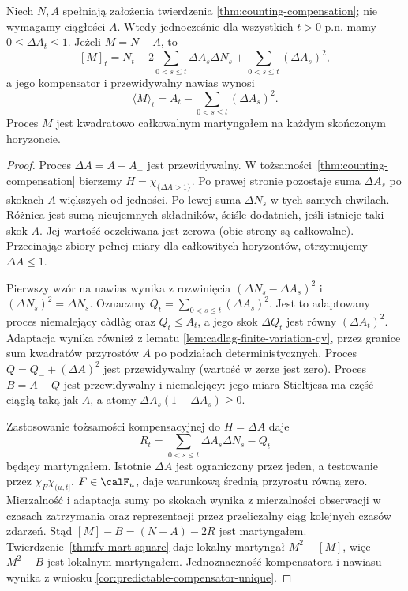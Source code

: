\begin{twierdzenie}
\label{thm:counting-discontinuous-bracket}
Niech $N,A$ spełniają założenia twierdzenia
\ref{thm:counting-compensation}; nie wymagamy
ciągłości $A$. Wtedy jednocześnie dla
wszystkich $t>0$ p.n. mamy
$0\le\Delta A_t\le1$.
Jeżeli $M=N-A$, to
\[
[M]_t=N_t-2\sum_{0<s\le t}\Delta A_s\Delta N_s
+\sum_{0<s\le t}(\Delta A_s)^2,
\]
a jego kompensator i przewidywalny nawias wynosi
\[
\langle M\rangle_t=A_t-\sum_{0<s\le t}(\Delta A_s)^2.
\]
Proces $M$ jest kwadratowo całkowalnym
martyngałem na każdym skończonym horyzoncie.
\end{twierdzenie}
\begin{proof}
Proces $\Delta A=A-A_-$ jest przewidywalny.
W tożsamości~\ref{thm:counting-compensation}
bierzemy $H=\chi_{\{\Delta A>1\}}$.
Po prawej stronie pozostaje suma $\Delta A_s$
po skokach $A$ większych od jedności.
Po lewej suma $\Delta N_s$ w tych samych
chwilach. Różnica jest sumą nieujemnych
składników, ściśle dodatnich, jeśli istnieje
taki skok $A$. Jej wartość oczekiwana jest
zerowa (obie strony są całkowalne).
Przecinając zbiory pełnej miary dla całkowitych
horyzontów, otrzymujemy $\Delta A\le1$.

Pierwszy wzór na nawias wynika z rozwinięcia
$(\Delta N_s-\Delta A_s)^2$ i
$(\Delta N_s)^2=\Delta N_s$.
Oznaczmy $Q_t=\sum_{0<s\le t}(\Delta A_s)^2$.
Jest to adaptowany proces niemalejący c\`adl\`ag
oraz $Q_t\le A_t$, a jego skok $\Delta Q_t$
jest równy $(\Delta A_t)^2$.
Adaptacja wynika również z lematu
\ref{lem:cadlag-finite-variation-qv},
przez granice sum kwadratów przyrostów $A$
po podziałach deterministycznych.
Proces $Q=Q_-+(\Delta A)^2$ jest
przewidywalny (wartość w zerze jest zero).
Proces $B=A-Q$ jest przewidywalny i niemalejący:
jego miara Stieltjesa ma część ciągłą taką
jak $A$, a atomy $\Delta A_s(1-\Delta A_s)\ge0$.

Zastosowanie tożsamości kompensacyjnej
do $H=\Delta A$ daje
\[
R_t=\sum_{0<s\le t}\Delta A_s\Delta N_s-Q_t
\]
będący martyngałem. Istotnie $\Delta A$ jest
ograniczony przez jeden, a testowanie przez
$\chi_F\chi_{(u,t]}$, $F\in\calF_u$,
daje warunkową średnią przyrostu równą zero.
Mierzalność i adaptacja sumy po skokach
wynika z mierzalności obserwacji w czasach
zatrzymania oraz reprezentacji przez
przeliczalny ciąg kolejnych czasów zdarzeń.
Stąd
$[M]-B=(N-A)-2R$ jest martyngałem.
Twierdzenie~\ref{thm:fv-mart-square} daje
lokalny martyngał $M^2-[M]$, więc $M^2-B$
jest lokalnym martyngałem.
Jednoznaczność kompensatora i nawiasu
wynika z wniosku
\ref{cor:predictable-compensator-unique}.


\end{proof}
